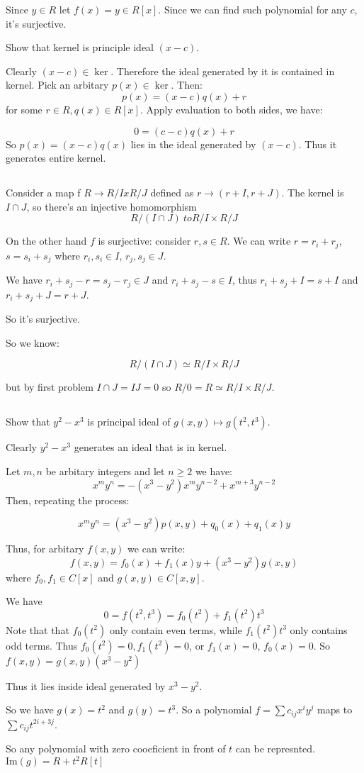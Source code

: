 \documentclass{amsart}
\begin{document}
Since $y \in R$ let $f(x) = y \in R[x]$. Since we can find such polynomial for any $c$, it's surjective.



Show that kernel is principle ideal $(x-c)$. 

Clearly $(x-c) \in \ker$. Therefore the ideal generated by it is contained in kernel. Pick an arbitary $p(x) \in \ker$. Then:
$$ p(x) = (x-c) q(x) + r$$
for some $r \in R, q(x) \in R[x]$.
Apply evaluation to both sides, we have:

$$ 0 = (c-c) q(x) + r$$
So $p(x) = (x-c) q(x)$ lies in the ideal generated by $(x-c)$. Thus it generates entire kernel.

\subsection{}

Consider a map f $R \to R/I x R/J$ defined as $r \to (r+I, r+J)$. The kernel is $I \cap J$, so there's an injective homomorphism
$$R/ (I \cap J) \ to R/I \times R/J$$

On the other hand $f$ is surjective: consider $r,s \in R$. We can write $r = r_i + r_j$, $s = s_i + s_j$ where $r_i, s_i \in I$, $r_j, s_j \in J$. 

We have $ r_i + s_j - r = s_j - r_j \in J$ and $r_i + s_j - s \in I$, thus $r_i + s_j + I = s + I$ and $r_i + s_j + J = r + J$.

So it's surjective.

So we know:

$$ R / (I \cap J) \simeq R/I \times R/J$$

but by first problem $I \cap J = IJ = 0$ so $R / {0} = R \simeq R/I \times R/J$. 

\subsection{}

Show that $y^2 - x^3$ is principal ideal of $g(x,y) \mapsto g(t^2, t^3)$.

Clearly $y^2-x^3$ generates an ideal that is in kernel. 

Let $m, n$ be arbitary integers and let $n \geq 2$
we have:
$$ x^m y^n = - (x^3 - y^2) x^m y^{n-2} + x^{m+3} y^{n-2}
$$
Then, repeating the process:

$$ x^m y^n = (x^3-y^2) p(x,y) + q_0 (x) + q_1 (x) y$$

Thus, for arbitary $f(x,y)$ we can write:
$$
  f(x,y) = f_0(x) + f_1 (x) y + (x^3-y^2) g(x,y)
$$
where $f_0, f_1 \in C[x]$ and $g(x,y) \in C[x,y]$.

We have 
$$ 0 = f(t^2, t^3) = f_0 (t^2) + f_1 (t^2)t^3$$
Note that that $f_0 (t^2)$ only contain even terms, while $f_1(t^2) t^3$ only contains odd terms. Thus $f_0 (t^2) = 0, f_1(t^2)=0$, or $f_1 (x) =0$, $f_0 (x) = 0$.
So $f(x,y) = g(x,y) (x^3-y^2)$

Thus it lies inside ideal generated by $x^3-y^2$.

So we have $g(x) = t^2$ and $g(y) = t^3$. So a polynomial $f = \sum c_{ij} x^i y^j$ maps to $\sum c_{ij} t^{2i+3j}$. 

So any polynomial with zero cooeficient in front of $t$ can be represnted. $\text{Im} (g) = R + t^2 R[t]$
\end{document}
